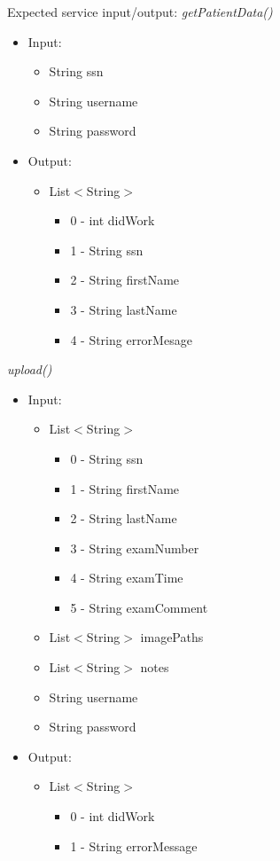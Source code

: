 \noindent Expected service input/output:
\newline
\textit{getPatientData()}
\begin{itemize}
\item Input:
    \begin{itemize}
    \item String ssn
    \item String username
    \item String password
    \end{itemize}
\item Output:
    \begin{itemize}
    \item List$<$String$>$
        \begin{itemize}
        \item 0 - int didWork
        \item 1 - String ssn
        \item 2 - String firstName
        \item 3 - String lastName
        \item 4 - String errorMesage
        \end{itemize}
    \end{itemize}
\end{itemize}
\newpage
\textit{upload()}
\begin{itemize}
\item Input:
    \begin{itemize}
    \item List$<$String$>$
        \begin{itemize}
        \item 0 - String ssn
        \item 1 - String firstName
        \item 2 - String lastName
        \item 3 - String examNumber
        \item 4 - String examTime
        \item 5 - String examComment
        \end{itemize}
    \item List$<$String$>$ imagePaths
    \item List$<$String$>$ notes
    \item String username
    \item String password
    \end{itemize}

\item Output:
    \begin{itemize}
    \item List$<$String$>$
        \begin{itemize}
        \item 0 - int didWork
        \item 1 - String errorMessage
        \end{itemize}
    \end{itemize}
\end{itemize}